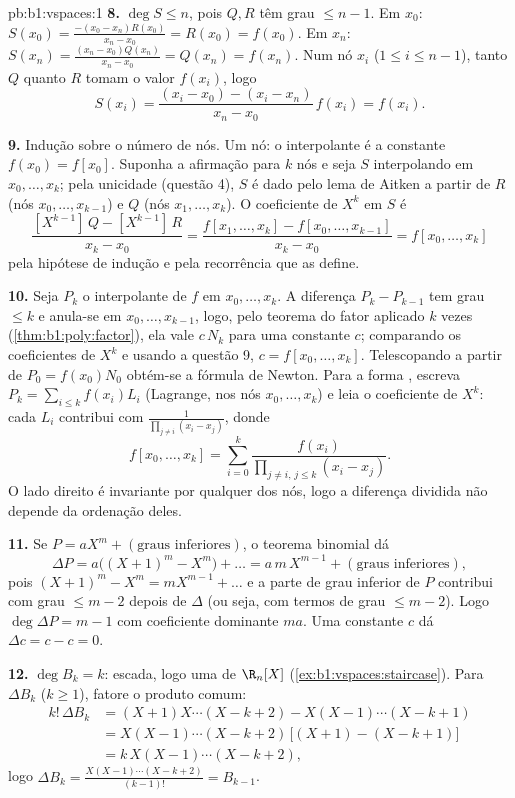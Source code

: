 \begin{solution}{pb:b1:vspaces:1}
\textbf{8.} $\deg S \leq n$, pois $Q, R$ têm grau $\leq n - 1$.
Em $x_0$: $S(x_0) = \frac{-(x_0 - x_n) R(x_0)}{x_n - x_0} =
R(x_0) = f(x_0)$. Em $x_n$: $S(x_n) = \frac{(x_n - x_0)
Q(x_n)}{x_n - x_0} = Q(x_n) = f(x_n)$. Num nó  $x_i$
($1 \leq i \leq n-1$), tanto $Q$ quanto $R$ tomam o valor $f(x_i)$, logo
\[
S(x_i) = \frac{(x_i - x_0) - (x_i - x_n)}{x_n - x_0}\, f(x_i)
= f(x_i) .
\]

\textbf{9.} Indução sobre o número de nós. Um nó: o interpolante é
a constante $f(x_0) = f[x_0]$. Suponha a afirmação para $k$ nós e seja $S$
interpolando em $x_0, \dots, x_k$; pela unicidade (questão 4), $S$ é dado pelo
lema de Aitken a partir de $R$ (nós $x_0, \dots, x_{k-1}$) e $Q$ (nós $x_1, \dots, x_k$).
O coeficiente de $X^{k}$ em $S$ é
\[
\frac{[X^{k-1}]\,Q - [X^{k-1}]\,R}{x_k - x_0}
= \frac{f[x_1, \dots, x_k] - f[x_0, \dots, x_{k-1}]}{x_k - x_0}
= f[x_0, \dots, x_k]
\]
pela hipótese de indução e pela recorrência que as define.

\textbf{10.} Seja $P_k$ o interpolante de $f$ em $x_0, \dots, x_k$. A
diferença $P_k - P_{k-1}$ tem grau $\leq k$ e anula-se em $x_0, \dots, x_{k-1}$, logo, pelo
teorema do fator aplicado $k$ vezes (\cref{thm:b1:poly:factor}), ela vale $c\,N_k$ para
uma constante $c$; comparando os coeficientes de $X^{k}$ e usando a
questão 9, $c =
f[x_0, \dots, x_k]$. Telescopando a partir de $P_0 = f(x_0) N_0$ obtém-se a fórmula
de Newton. Para a forma , escreva $P_k = \sum_{i \leq
k} f(x_i) L_i$ (Lagrange, nos nós
$x_0, \dots, x_k$) e leia o coeficiente de $X^{k}$: cada $L_i$ contribui com
$\frac{1}{\prod_{j \neq i}(x_i - x_j)}$, donde
\[
f[x_0, \dots, x_k] = \sum_{i=0}^{k}
\frac{f(x_i)}{\prod_{j \neq i,\, j \leq k}(x_i - x_j)} .
\]
O lado direito é invariante por qualquer  dos nós, logo a
diferença dividida não depende da ordenação deles.

\textbf{11.} Se $P = a X^m + (\text{graus inferiores})$, o teorema binomial dá
\[
\Delta P = a\bigl((X+1)^m - X^m\bigr) + \dots
= a\,m\,X^{m-1} + (\text{graus inferiores}),
\]
pois $(X+1)^m - X^m = m X^{m-1} + \dots$ e a parte de grau inferior de $P$ contribui com grau
$\leq m - 2$ depois de $\Delta$ (ou seja, com termos de grau $\leq m-2$). Logo
$\deg \Delta P = m - 1$ com coeficiente dominante $m a$. Uma constante $c$ dá $\Delta c = c - c = 0$.

\textbf{12.} $\deg B_k = k$: escada, logo uma  de $\R_n[X]$ (\cref{ex:b1:vspaces:staircase}).
Para $\Delta B_k$ ($k \geq 1$), fatore o produto comum:
\begin{align*}
k!\,\Delta B_k
&= (X+1)X\cdots(X-k+2) - X(X-1)\cdots(X-k+1) \\
&= X(X-1)\cdots(X-k+2)\,\bigl[(X+1) - (X-k+1)\bigr] \\
&= k\,X(X-1)\cdots(X-k+2),
\end{align*}
logo $\Delta B_k = \frac{X(X-1)\cdots(X-k+2)}{(k-1)!} = B_{k-1}$.


\end{solution}
